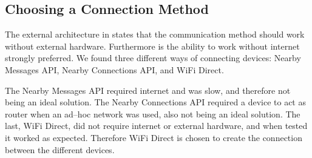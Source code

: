 \subsection{Choosing a Connection Method}
The external architecture in  states that the communication method should work without external hardware.
Furthermore is the ability to work without internet strongly preferred.
We found three different ways of connecting devices: Nearby Messages API, Nearby Connections API, and WiFi Direct.

The Nearby Messages API required internet and was slow, and therefore not being an ideal solution.
The Nearby Connections API required a device to act as router when an ad--hoc network was used, also not being an ideal solution.
The last, WiFi Direct, did not require internet or external hardware, and when tested it worked as expected.
Therefore WiFi Direct is chosen to create the connection between the different devices.
